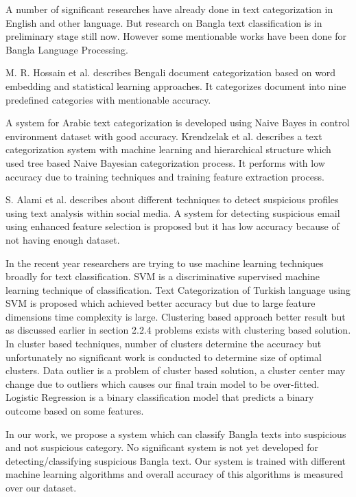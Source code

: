 A number of significant researches have already done in text categorization in English and other language. But research on Bangla text classification is in preliminary stage still now. However some mentionable works have been done for Bangla Language Processing.
\par
\vspace{0.5cm}
 M. R. Hossain et al. describes Bengali document categorization based on word embedding and statistical learning approaches\cite{hossain2018automatic}. It categorizes document into nine predefined categories with mentionable accuracy.\par 
 A system for Arabic text categorization is developed using Naive Bayes in control environment dataset with good accuracy\cite{alsaleem2011automated}. Krendzelak et al. describes a text categorization system with machine learning and hierarchical structure which used tree based Naive Bayesian categorization process\cite{krendzelak2015text, chy2014bangla}. It performs with low accuracy due to training techniques and training feature extraction process.\par
 S. Alami et al. describes about different techniques to detect suspicious profiles using text analysis within social media\cite{alami2015detecting}. A system for detecting suspicious email using enhanced feature selection is proposed but it has low accuracy because of not having enough dataset\cite{nizamani2013modeling}.
 \par 
 In the recent year researchers are trying to use machine learning techniques broadly for text classification. SVM is a discriminative supervised machine learning technique of classification. Text Categorization of Turkish language using SVM is proposed which achieved better accuracy but due to large feature dimensions time complexity is large\cite{kaya2012sentiment}. Clustering based approach \cite{ismail2014bangla, ahmad2016bengali} better result but as discussed earlier in section 2.2.4 problems exists with clustering based solution. In cluster based techniques, number of clusters determine the accuracy but unfortunately no significant work is conducted to determine size of optimal clusters. Data outlier is a problem of cluster based solution, a cluster center may change due to outliers which causes our final train model to be over-fitted. Logistic Regression\cite{sharma2015active} is a binary classification model that predicts a binary outcome based on some features. \par 
 \vspace{0.5cm}
 \noindent
 In our work, we propose a system which can classify Bangla texts into suspicious and not suspicious category. No significant system is not yet developed for detecting/classifying suspicious Bangla text. Our system is trained with different machine learning algorithms and overall accuracy of this algorithms is measured over our dataset.        